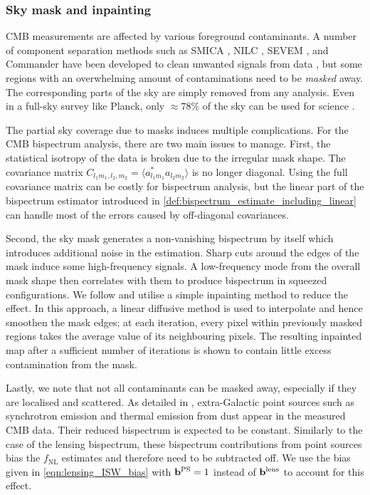 \subsubsection*{Sky mask and inpainting}

CMB measurements are affected by various foreground contaminants. A number of component separation methods such as SMICA \cite{Cardoso2008component}, NILC \cite{Basak2012nilc}, SEVEM \cite{Martinez2003sevem}, and Commander \cite{Eriksen2008commander} have been developed to clean unwanted signals from data \cite{PlanckCollaboration2018component}, but some regions with an overwhelming amount of contaminations need to be \textit{masked} away. The corresponding parts of the sky are simply removed from any analysis. Even in a full-sky survey like Planck, only $\approx 78\%$ of the sky can be used for science \cite{PlanckCollaboration2018component}.

The partial sky coverage due to masks induces multiple complications. For the CMB bispectrum analysis, there are two main issues to manage. First, the statistical isotropy of the data is broken due to the irregular mask shape. The covariance matrix $C_{l_1 m_1, l_2, m_2} = \langle a^*_{l_1 m_1} a_{l_2 m_2} \rangle$ is no longer diagonal. Using the full covariance matrix can be costly for bispectrum analysis, but the linear part of the bispectrum estimator introduced in \eqref{def:bispectrum_estimate_including_linear} can handle most of the errors caused by off-diagonal covariances.

Second, the sky mask generates a non-vanishing bispectrum by itself which introduces additional noise in the estimation. Sharp cuts around the edges of the mask induce some high-frequency signals. A low-frequency mode from the overall mask shape then correlates with them to produce bispectrum in squeezed configurations. We follow \cite{Gruetjen2017inpainting} and utilise a simple inpainting method to reduce the effect. In this approach, a linear diffusive method is used to interpolate and hence smoothen the mask edges; at each iteration, every pixel within previously masked regions takes the average value of its neighbouring pixels. The resulting inpainted map after a sufficient number of iterations is shown to contain little excess contamination from the mask. 

Lastly, we note that not all contaminants can be masked away, especially if they are localised and scattered. As detailed in \cite{PlanckCollaboration2013}, extra-Galactic point sources such as synchrotron emission and thermal emission from dust appear in the measured CMB data. Their reduced bispectrum is expected to be constant. Similarly to the case of the lensing bispectrum, these bispectrum contributions from point sources bias the $f_\text{NL}$ estimates and therefore need to be subtracted off. We use the bias given in \eqref{eqn:lensing_ISW_bias} with $\mathbf{b}^\text{PS}=1$ instead of $\mathbf{b}^\text{lens}$ to account for this effect.

